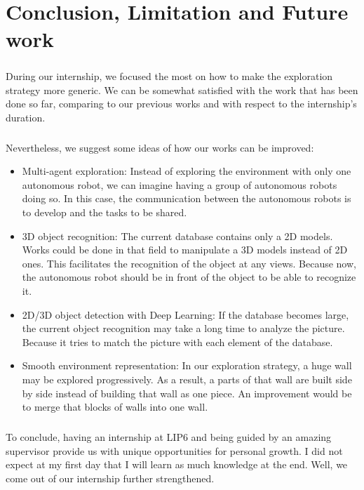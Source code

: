 \documentclass[12pt]{report}
\begin{document}
	\chapter*{Conclusion, Limitation and Future work}
	\paragraph{}
	During our internship, we focused the most on how to make the exploration strategy more generic. We can be somewhat satisfied with the work that has been done so far, comparing to our previous works and with respect to the internship's duration.

	\paragraph{}
	Nevertheless, we suggest some ideas of how our works can be improved:
	\begin{itemize}
		\item Multi-agent exploration: Instead of exploring the environment with only one autonomous robot, we can imagine having a group of autonomous robots doing so. In this case, the communication between the autonomous robots is to develop and the tasks to be shared.
		\item 3D object recognition: The current database contains only a 2D models. Works could be done in that field to manipulate a 3D models instead of 2D ones. This facilitates the recognition of the object at any views. Because now, the autonomous robot should be in front of the object to be able to recognize it.
		\item 2D/3D object detection with Deep Learning: If the database becomes large, the current object recognition may take a long time to analyze the picture. Because it tries to match the picture with each element of the database.
		\item Smooth environment representation: In our exploration strategy, a huge wall may be explored progressively. As a result, a parts of that wall are built side by side instead of building that wall as one piece. An improvement would be to merge that blocks of walls into one wall.
		
	\end{itemize}
\paragraph{}
To conclude, having an internship at LIP6 and being guided by an amazing supervisor provide us with unique opportunities for personal growth. I did not expect at my first day that I will learn as much knowledge at the end. Well, we come out of our internship further strengthened. 
	
	


\end{document}
